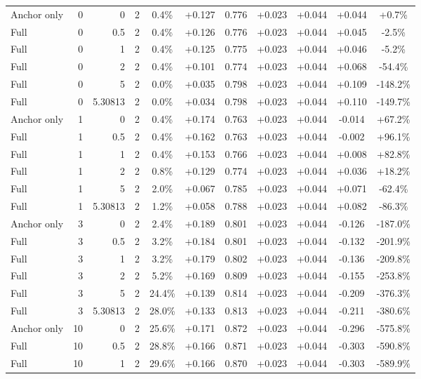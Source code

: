 \begin{table}[htbp]
\begin{tabular}{lrrrccccccc}
Anchor only & 0 & 0 & 2 & 0.4\% & +0.127 & 0.776 & +0.023 & +0.044 & +0.044 & +0.7\% \\
Full & 0 & 0.5 & 2 & 0.4\% & +0.126 & 0.776 & +0.023 & +0.044 & +0.045 & -2.5\% \\
Full & 0 & 1 & 2 & 0.4\% & +0.125 & 0.775 & +0.023 & +0.044 & +0.046 & -5.2\% \\
Full & 0 & 2 & 2 & 0.4\% & +0.101 & 0.774 & +0.023 & +0.044 & +0.068 & -54.4\% \\
Full & 0 & 5 & 2 & 0.0\% & +0.035 & 0.798 & +0.023 & +0.044 & +0.109 & -148.2\% \\
Full & 0 & 5.30813 & 2 & 0.0\% & +0.034 & 0.798 & +0.023 & +0.044 & +0.110 & -149.7\% \\
Anchor only & 1 & 0 & 2 & 0.4\% & +0.174 & 0.763 & +0.023 & +0.044 & -0.014 & +67.2\% \\
Full & 1 & 0.5 & 2 & 0.4\% & +0.162 & 0.763 & +0.023 & +0.044 & -0.002 & +96.1\% \\
Full & 1 & 1 & 2 & 0.4\% & +0.153 & 0.766 & +0.023 & +0.044 & +0.008 & +82.8\% \\
Full & 1 & 2 & 2 & 0.8\% & +0.129 & 0.774 & +0.023 & +0.044 & +0.036 & +18.2\% \\
Full & 1 & 5 & 2 & 2.0\% & +0.067 & 0.785 & +0.023 & +0.044 & +0.071 & -62.4\% \\
Full & 1 & 5.30813 & 2 & 1.2\% & +0.058 & 0.788 & +0.023 & +0.044 & +0.082 & -86.3\% \\
Anchor only & 3 & 0 & 2 & 2.4\% & +0.189 & 0.801 & +0.023 & +0.044 & -0.126 & -187.0\% \\
Full & 3 & 0.5 & 2 & 3.2\% & +0.184 & 0.801 & +0.023 & +0.044 & -0.132 & -201.9\% \\
Full & 3 & 1 & 2 & 3.2\% & +0.179 & 0.802 & +0.023 & +0.044 & -0.136 & -209.8\% \\
Full & 3 & 2 & 2 & 5.2\% & +0.169 & 0.809 & +0.023 & +0.044 & -0.155 & -253.8\% \\
Full & 3 & 5 & 2 & 24.4\% & +0.139 & 0.814 & +0.023 & +0.044 & -0.209 & -376.3\% \\
Full & 3 & 5.30813 & 2 & 28.0\% & +0.133 & 0.813 & +0.023 & +0.044 & -0.211 & -380.6\% \\
Anchor only & 10 & 0 & 2 & 25.6\% & +0.171 & 0.872 & +0.023 & +0.044 & -0.296 & -575.8\% \\
Full & 10 & 0.5 & 2 & 28.8\% & +0.166 & 0.871 & +0.023 & +0.044 & -0.303 & -590.8\% \\
Full & 10 & 1 & 2 & 29.6\% & +0.166 & 0.870 & +0.023 & +0.044 & -0.303 & -589.9\% \\

\end{tabular}
\end{table}
